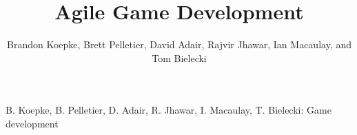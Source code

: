 \title{Agile Game Development}

\author{Brandon Koepke, Brett Pelletier, David Adair, Rajvir Jhawar, Ian Macaulay, and Tom Bielecki}

%
{B. Koepke, B. Pelletier, D. Adair, R. Jhawar, I. Macaulay, T. Bielecki: Game development}

\maketitle
